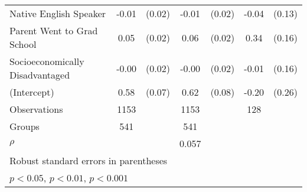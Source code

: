 {\begin{tabular}{l*{3}{cc}}
Native English Speaker&       -0.01         &      (0.02)&       -0.01         &      (0.02)&       -0.04         &      (0.13)\\
Parent Went to Grad School&        0.05\sym{*}  &      (0.02)&        0.06\sym{*}  &      (0.02)&        0.34\sym{*}  &      (0.16)\\
Socioeconomically Disadvantaged&       -0.00         &      (0.02)&       -0.00         &      (0.02)&       -0.01         &      (0.16)\\
(Intercept)         &        0.58\sym{***}&      (0.07)&        0.62\sym{***}&      (0.08)&       -0.20         &      (0.26)\\
\midrule
Observations        &        1153         &            &        1153         &            &         128         &            \\
Groups              &         541         &            &         541         &            &                     &            \\
$\rho$              &                     &            &       0.057         &            &                     &            \\
\bottomrule
\multicolumn{7}{l}{\footnotesize Robust standard errors in parentheses}\\
\multicolumn{7}{l}{\footnotesize \sym{*} \(p<0.05\), \sym{**} \(p<0.01\), \sym{***} \(p<0.001\)}\\
\end{tabular}
}
